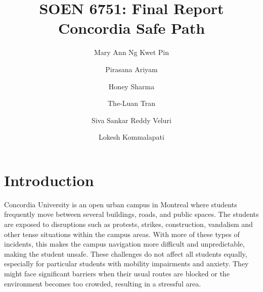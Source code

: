\documentclass[sigconf]{acmart}
\begin{document}
\title{SOEN 6751: Final Report\\Concordia Safe Path}

\author{Mary Ann Ng Kwet Pin}

\author{Pirasana Ariyam}

\author{Honey Sharma}

\author{The-Luan Tran}

\author{Siva Sankar Reddy Veluri}

\author{Lokesh Kommalapati}

\maketitle

\fancyfoot{}
\pagestyle{fancy}
\setlength{\footskip}{30pt}
 
\fancyhead{}
 
\section{Introduction}

Concordia University is an open urban campus in Montreal where students frequently move between several buildings, roads, and public spaces. The students are exposed to disruptions such as protests, strikes, construction, vandalism and other tense situations within the campus areas. With more of these types of incidents, this makes the campus navigation more difficult and unpredictable, making the student unsafe. These challenges do not affect all students equally, especially for particular students with mobility impairments and anxiety. They might face significant barriers when their usual routes are blocked or the environment becomes too crowded, resulting in a stressful area.
 
\end{document}
